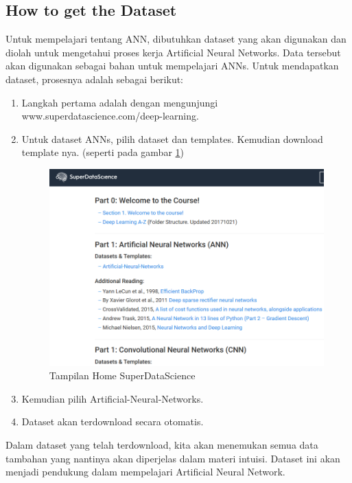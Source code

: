 \subsection{How to get the Dataset}
Untuk mempelajari tentang ANN, dibutuhkan dataset yang akan digunakan dan diolah untuk mengetahui proses kerja Artificial Neural Networks.
Data tersebut akan digunakan sebagai bahan untuk mempelajari ANNs.
Untuk mendapatkan dataset, prosesnya adalah sebagai berikut:
\begin{enumerate}
  \item Langkah pertama adalah dengan mengunjungi www.superdatascience.com/deep-learning.
  \item Untuk dataset ANNs, pilih dataset dan templates. Kemudian download template nya. (seperti pada gambar \ref{labelgambar8})
      \begin{figure}[h!]
	  \centering
	  \includegraphics[scale=0.4]{figures/anns.PNG}
	  \caption{Tampilan Home SuperDataScience}
	  \label{labelgambar8}
	  \end{figure}
  \item Kemudian pilih Artificial-Neural-Networks.
  \item Dataset akan terdownload secara otomatis.
\end{enumerate}

Dalam dataset yang telah terdownload, kita akan menemukan semua data tambahan yang nantinya akan diperjelas dalam materi intuisi. Dataset ini akan menjadi pendukung dalam mempelajari Artificial Neural Network. 
